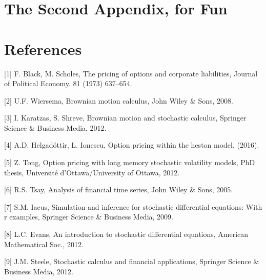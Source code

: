 \documentclass[12pt,twoside]{reedthesis}
\theoremstyle{definition}
\theoremstyle{definition}
\theoremstyle{remark}
\begin{document}
  \chapter{The Second Appendix, for
  Fun}\label{the-second-appendix-for-fun}
  
  \backmatter
  
  \chapter*{References}\label{references}
  
  \noindent
  
  \setlength{\parindent}{-0.20in} \setlength{\leftskip}{0.20in}
  \setlength{\parskip}{8pt}
  
  \hypertarget{refs}{}
  \hypertarget{ref-black1973pricing}{}
  {[}1{]} F. Black, M. Scholes, The pricing of options and corporate
  liabilities, Journal of Political Economy. 81 (1973) 637--654.
  
  \hypertarget{ref-ubbo}{}
  {[}2{]} U.F. Wiersema, Brownian motion calculus, John Wiley \& Sons,
  2008.
  
  \hypertarget{ref-karatzas2012brownian}{}
  {[}3{]} I. Karatzas, S. Shreve, Brownian motion and stochastic calculus,
  Springer Science \& Business Media, 2012.
  
  \hypertarget{ref-helgadottir2016option}{}
  {[}4{]} A.D. Helgadóttir, L. Ionescu, Option pricing within the heston
  model, (2016).
  
  \hypertarget{ref-tong2012option}{}
  {[}5{]} Z. Tong, Option pricing with long memory stochastic volatility
  models, PhD thesis, Université d'Ottawa/University of Ottawa, 2012.
  
  \hypertarget{ref-tsay2005analysis}{}
  {[}6{]} R.S. Tsay, Analysis of financial time series, John Wiley \&
  Sons, 2005.
  
  \hypertarget{ref-iacus2009simulation}{}
  {[}7{]} S.M. Iacus, Simulation and inference for stochastic differential
  equations: With r examples, Springer Science \& Business Media, 2009.
  
  \hypertarget{ref-evans2012introduction}{}
  {[}8{]} L.C. Evans, An introduction to stochastic differential
  equations, American Mathematical Soc., 2012.
  
  \hypertarget{ref-steele2012stochastic}{}
  {[}9{]} J.M. Steele, Stochastic calculus and financial applications,
  Springer Science \& Business Media, 2012.
  
\end{document}
